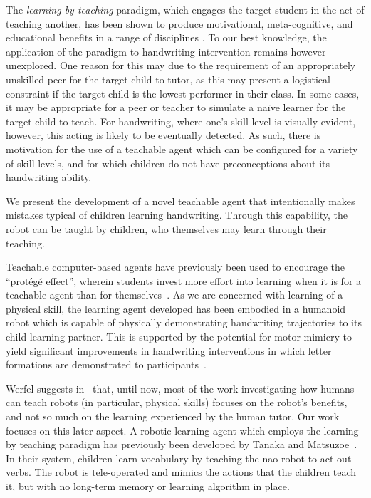 \documentclass{sig-alternate}
\begin{document}
The \emph{learning by teaching} paradigm, which engages the target student in
the act of teaching another, has been shown to produce motivational,
meta-cognitive, and educational benefits in a range of disciplines
\cite{Rohrbeck2003}. To our best knowledge, the application of the paradigm to
handwriting intervention remains however unexplored. One reason for this may due
to the requirement of an appropriately unskilled peer for the target child to
tutor, as this may present a logistical constraint if the target child is the
lowest performer in their class.  In some cases, it may be appropriate for a
peer or teacher to simulate a na\"ive learner for the target child to teach.
For handwriting, where one's skill level is visually evident, however, this
acting is likely to be eventually detected. As such, there is motivation for the
use of a teachable agent which can be configured for a variety of skill levels,
and for which children do not have preconceptions about its handwriting ability.

We present the development of a novel teachable agent
that intentionally makes mistakes typical of children learning
handwriting. Through this capability, the robot can be taught by
children, who themselves may learn through their teaching.

Teachable computer-based agents have previously been used to encourage the 
``protégé effect'', wherein students invest more effort into learning when it
is for a teachable agent than for themselves~\cite{Chase2009}. As we are 
concerned with learning of a physical skill, the learning agent developed has 
been embodied in a humanoid robot which is capable of physically demonstrating 
handwriting trajectories to its child learning partner.
This is supported by the potential for motor mimicry to yield significant 
improvements in handwriting interventions in which letter formations are 
demonstrated to participants~\cite{Berninger1997}.

Werfel suggests in~\cite{Werfel2014} that, until now, most of the work investigating how
humans can teach robots (in particular, physical skills) focuses on the robot's
benefits, and not so much on the learning experienced by the human tutor. Our
work focuses on this later aspect. A robotic learning agent which employs the learning by teaching paradigm has 
previously been developed by Tanaka and Matsuzoe~\cite{Tanaka2012}. In their
system, children learn vocabulary by teaching the {\sc nao} robot to act out 
verbs. The robot is tele-operated and mimics the actions that the children
teach it, but with no long-term memory or learning algorithm in place.
\end{document}
